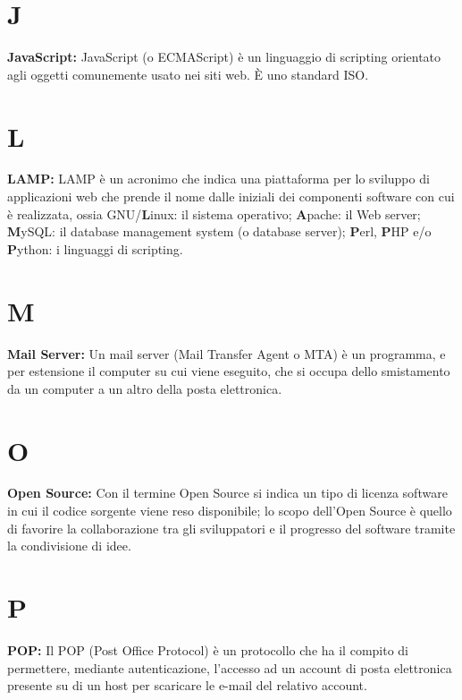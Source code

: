 {\section*{J}
\hypertarget{javascript}{}
\textbf{JavaScript:}
JavaScript (o ECMAScript) \`e un linguaggio di scripting orientato agli oggetti comunemente usato nei siti web. \`E  uno standard ISO.\\

\section*{L}
\hypertarget{lamp}{}
\textbf{LAMP:}
LAMP \`e un acronimo che indica una piattaforma per lo sviluppo di applicazioni web che prende il nome dalle iniziali dei componenti software con cui è realizzata, ossia GNU/\textbf{L}inux: il sistema operativo; \textbf{A}pache: il Web server; \textbf{M}ySQL: il database management system (o database server); \textbf{P}erl, \textbf{P}HP e/o \textbf{P}ython: i linguaggi di scripting.

\section*{M}
\hypertarget{mail_server}{}
\textbf{Mail Server:}
Un mail server (Mail Transfer Agent o MTA) \`e un programma, e per estensione il computer su cui viene eseguito, che si occupa dello smistamento da un computer a un altro della posta elettronica.\\

\section*{O}
\hypertarget{opensource}{}
\textbf{Open Source:}
Con il termine Open Source si indica un tipo di licenza software in cui il codice sorgente viene reso disponibile; lo scopo dell'Open Source \`e quello di favorire la collaborazione tra gli sviluppatori e il progresso del software tramite la condivisione di idee.\\

\section*{P}
\hypertarget{pop}{}
\textbf{POP:}
Il POP (Post Office Protocol) \`e un protocollo che ha il compito di permettere, mediante autenticazione, l'accesso ad un account di posta elettronica presente su di un host per scaricare le e-mail del relativo account.\\

}
